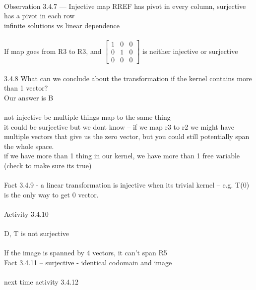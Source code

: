 \documentclass{article}
\begin{document}
\\
Observation 3.4.7 --- Injective map RREF has pivot in every column, surjective has a pivot in each row
\\
infinite solutions vs linear dependence\\
\\
If map goes from R3 to R3, and 
$\begin{bmatrix} 1&0&0 \\ 0&1&0 \\ 0&0&0 \end{bmatrix}$
is neither injective or surjective\\
\\
3.4.8 What can we conclude about the transformation if the kernel contains more than 1 vector?\\
Our answer is B\\
\\
not injective bc multiple things map to the same thing\\
it could be surjective but we dont know -- if we map r3 to r2 we might have multiple vectors that give us the zero vector, but you could still potentially span the whole space.\\
if we have more than 1 thing in our kernel, we have more than 1 free variable (check to make sure its true)\\
\\
Fact 3.4.9 - a linear transformation is injective when its trivial kernel -- e.g. T(0) is the only way to get 0 vector.\\
\\
Activity 3.4.10\\
\\
D, T is not surjective\\
\\
If the image is spanned by 4 vectors, it can't span R5 
\\
Fact 3.4.11 -- surjective - identical codomain and image\\
\\
next time activity 3.4.12 


\\

\\

\\
\\

\\
\\
\end{document}
